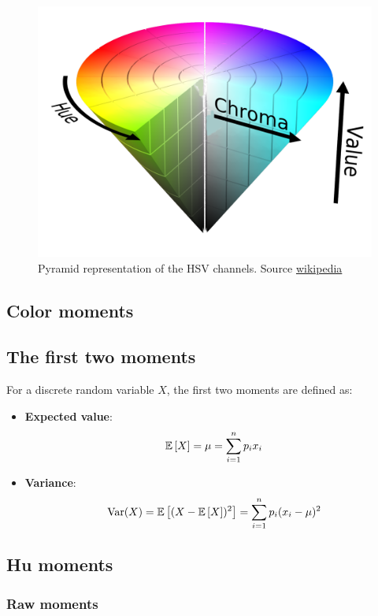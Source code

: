 \begin{figure}
    \centering
    \includegraphics[scale=0.2]{img/HSV_pyramid.png}
    \caption[Pyramid representation of the HSV channels]{Pyramid representation of the HSV channels. Source \href{https://en.wikipedia.org/wiki/HSL_and_HSV}{wikipedia}}
    \label{fig:hsv_pyramid}
\end{figure}


\subsection{Color moments}

\subsection{The first two moments}

For a discrete random variable $X$, the first two moments are defined as:
\begin{itemize}
    \item \textbf{Expected value}: $$\mathbb{E} \left[ X \right] = \mu = \sum_{i = 1}^{n} p_i x_i $$
    \item \textbf{Variance}:  $$ \operatorname{Var} (X)= \mathbb{E} \left[ (X - \mathbb{E} \left[ X \right] )^2 \right] =\sum _{i=1}^{n} p_i (x_{i} - \mu )^{2} $$
\end{itemize}

\subsection{Hu moments}

\subsubsection{Raw moments}

